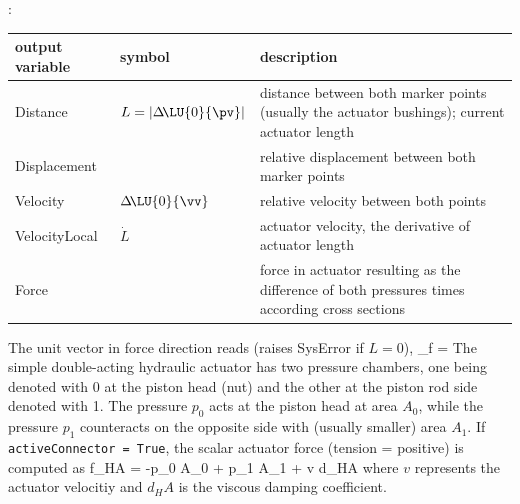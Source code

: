 :
\begin{center}
\footnotesize
\begin{longtable}{| p{5cm} | p{5cm} | p{6cm} |} 
\hline
\bf output variable & \bf symbol & \bf description \\ \hline
Distance & $L = |\Delta\! \LU{0}{\pv}|$ & distance between both marker points (usually the actuator bushings); current actuator length\\ \hline
Displacement &  & relative displacement between both marker points\\ \hline
Velocity & $\Delta\! \LU{0}{\vv}$ & relative velocity between both points\\ \hline
VelocityLocal & $\dot L$ & actuator velocity, the derivative of actuator length\\ \hline
Force &  & force in actuator resulting as the difference of both pressures times according cross sections\\ \hline
\end{longtable}
\end{center}
 \noindent
    \finishTable
    The unit vector in force direction reads (raises SysError if $L=0$),
    \be
      \vv_{f} =  \Delta\! 
    \ee
    The simple double-acting hydraulic actuator has two pressure chambers, one being denoted with 0 at the
    piston head (nut) and the other at the piston rod side denoted with 1. The pressure $p_0$ acts at the piston head at area $A_0$, 
    while the pressure $p_1$ counteracts on the opposite side with (usually smaller) area $A_1$.
    If \texttt{activeConnector = True}, the scalar actuator force (tension = positive) is computed as
    \be
      f_{HA} = -p_0 \cdot A_0 + p_1 \cdot A_1 + v \cdot d_HA
    \ee
    where $v$ represents the actuator velocitiy and $d_HA$ is the viscous damping coefficient.

